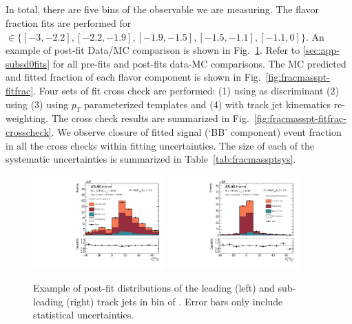 \clearpage
\subsection{\mpt}

In total, there are five bins of the \mpt observable we are measuring. The flavor fraction fits are performed for \mpt $\in\{[-3, -2.2], [-2.2, -1.9], [-1.9, -1.5], [-1.5, -1.1], [-1.1,0]\}$. An example of post-fit Data/MC comparison is shown in Fig.~\ref{fig:fracmasspt-fit-example}. Refer to \ref{sec:app-subsd0fits} for all pre-fits and post-fits data-MC comparisons. The MC predicted and fitted fraction of each flavor component is shown in Fig.~\ref{fig:fracmasspt-fitfrac}. Four sets of fit cross check are performed: (1) using \sdzero as discriminant (2) using \subsubsdzero (3) using $p_T$ parameterized templates and (4) with track jet kinematics re-weighting. The cross check results are summarized in Fig.~\ref{fig:fracmasspt-fitfrac-crosscheck}. We observe closure of fitted signal (`BB' component) event fraction in all the cross checks within fitting uncertainties. The size of each of the systematic uncertainties is summarized in Table~\ref{tab:fracmassptsys}.


\begin{figure}[htbp]
  \centering
 \includegraphics[width=0.45\textwidth]{figures/gbb/paperplots/Canv_Fit_M_LpT_INF_SpT_INF_coarse_x}
 \includegraphics[width=0.45\textwidth]{figures/gbb/paperplots/Canv_Fit_b0_25_M_0_3_LpT_INF_SpT_INF_coarse_y}
 \caption{Example of post-fit \subsdzero distributions of the leading (left) and sub-leading (right) track jets in bin of \mpt. Error bars only include statistical uncertainties.}
 \label{fig:fracmasspt-fit-example}
\end{figure}


